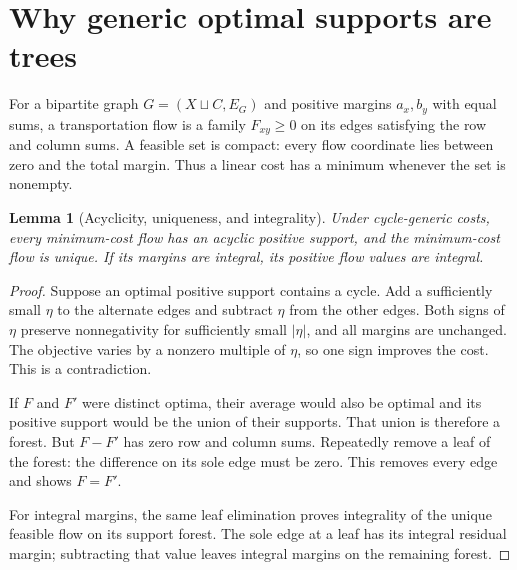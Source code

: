 \documentclass[11pt]{article}
\numberwithin{equation}{section}
\newtheorem{lemma}[theorem]{Lemma}
\theoremstyle{definition}
\begin{document}
\section{Why generic optimal supports are trees}
\label{tf:sec:transport}
For a bipartite graph $G=(X\sqcup C,E_G)$ and positive margins $a_x,b_y$
with equal sums, a transportation flow is a family $F_{xy}\ge0$ on its
edges satisfying the row and column sums. A feasible set is compact:
every flow coordinate lies between zero and the total margin. Thus a
linear cost has a minimum whenever the set is nonempty.

\begin{lemma}[Acyclicity, uniqueness, and integrality]
\label{tf:lem:forest}
Under cycle-generic costs, every minimum-cost flow has an acyclic positive
support, and the minimum-cost flow is unique. If its margins are integral,
its positive flow values are integral.
\end{lemma}
\begin{proof}
Suppose an optimal positive support contains a cycle. Add a sufficiently
small $\eta$ to the alternate edges and subtract $\eta$ from the other
edges. Both signs of $\eta$ preserve nonnegativity for sufficiently small
$|\eta|$, and all margins are unchanged. The objective varies by a
nonzero multiple of $\eta$, so one sign improves the cost. This is a
contradiction.

If $F$ and $F'$ were distinct optima, their average would also be optimal
and its positive support would be the union of their supports. That union
is therefore a forest. But $F-F'$ has zero row and column sums. Repeatedly
remove a leaf of the forest: the difference on its sole edge must be zero.
This removes every edge and shows $F=F'$.

For integral margins, the same leaf elimination proves integrality of the
unique feasible flow on its support forest. The sole edge at a leaf has
its integral residual margin; subtracting that value leaves integral
margins on the remaining forest.
\end{proof}
\end{document}
